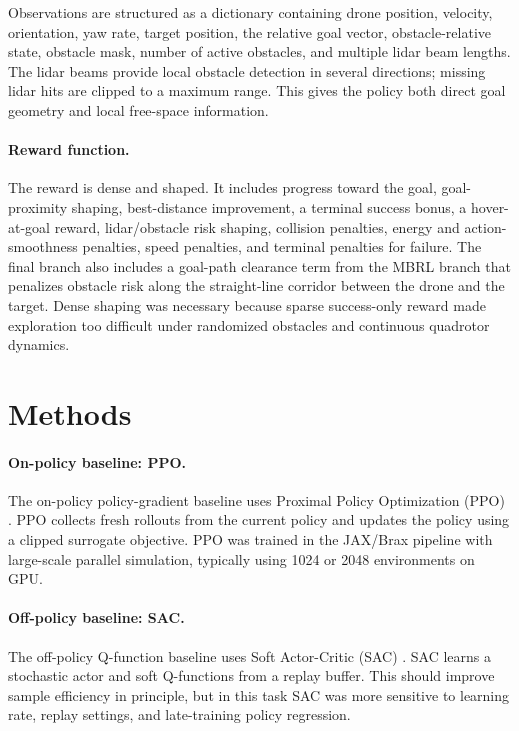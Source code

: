 \documentclass{article}
\begin{document}
Observations are structured as a dictionary containing drone position, velocity, orientation, yaw rate, target position, the relative goal vector, obstacle-relative state, obstacle mask, number of active obstacles, and multiple lidar beam lengths. The lidar beams provide local obstacle detection in several directions; missing lidar hits are clipped to a maximum range. This gives the policy both direct goal geometry and local free-space information.

\paragraph{Reward function.}
The reward is dense and shaped. It includes progress toward the goal, goal-proximity shaping, best-distance improvement, a terminal success bonus, a hover-at-goal reward, lidar/obstacle risk shaping, collision penalties, energy and action-smoothness penalties, speed penalties, and terminal penalties for failure. The final branch also includes a goal-path clearance term from the MBRL branch that penalizes obstacle risk along the straight-line corridor between the drone and the target. Dense shaping was necessary because sparse success-only reward made exploration too difficult under randomized obstacles and continuous quadrotor dynamics.

\section{Methods}
\paragraph{On-policy baseline: PPO.}
The on-policy policy-gradient baseline uses Proximal Policy Optimization (PPO) \cite{schulman2017ppo}. PPO collects fresh rollouts from the current policy and updates the policy using a clipped surrogate objective. PPO was trained in the JAX/Brax pipeline with large-scale parallel simulation, typically using 1024 or 2048 environments on GPU.

\paragraph{Off-policy baseline: SAC.}
The off-policy Q-function baseline uses Soft Actor-Critic (SAC) \cite{haarnoja2018sac}. SAC learns a stochastic actor and soft Q-functions from a replay buffer. This should improve sample efficiency in principle, but in this task SAC was more sensitive to learning rate, replay settings, and late-training policy regression.
\end{document}
